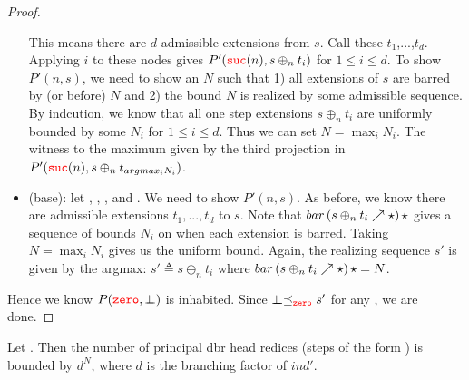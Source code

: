 \begin{proof}
\begin{itemize}
This means there are $d$ admissible extensions from $s$. Call these $t_1$,...,$t_d$.   
Applying $i$ to these nodes gives $P'({\color{red}{\mathtt{suc}}}(n), s\oplus_n t_i)$ for $1 \le i \le d$.
To show $P'(n,s)$, we need to show an $N$ such that 1) all extensions of $s$ are barred by (or before) $N$
and 2) the bound $N$ is realized by some admissible sequence. By indcution, we know that all 
one step extensions $s \oplus_n t_i$ are uniformly bounded by some $N_i$ for $1 \le i \le d$.
Thus we can set $N = \max_i{N_i}$. The witness to the maximum given by the third projection in 
$P'({\color{red}{\mathtt{suc}}}(n), s\oplus_n t_{argmax_i{N_i}})$. 
\item (base): let , , , and 
  . We need to show $P'(n,s)$. As before, we know there are admissible extensions
  $t_1,...,t_d$ to $s$. Note that $bar\,(s \oplus_n t_i \nearrow \star)\,\star$ gives a sequence of bounds $N_i$ 
  on when each extension is barred. Taking $N = \max_i{N_i}$ gives us the uniform bound. Again, the 
  realizing sequence $s'$ is given by the argmax: $s' \triangleq s \oplus_n t_i$ where
  $bar\,(s \oplus_n t_i \nearrow \star)\,\star = N$.
\end{itemize}
Hence we know $P(\zero,\empseq)$ is inhabited. Since $\empseq \preceq_{\zero} s'$ for any 
, we are done.
\end{proof}

\begin{lemma}
\iffalse 
  Suppose at each node, the number of successors is bounded by $d$, i.e. there is a value
  \begin{align*}
    \isVal{&fixed}{
      \sigmatyc{\isOf{d}{\lift{\nat}}}{\pityc{\isOf{n}{\lift{\nat}}}{\pityc{\isOf{s}{\lift{\nseq{n}}}}{
        \squash{R(n,s)} \tolr \\
        &\quad\quad\sigmatyc{\isOf{f}{\lift{\N_d} \to 
        \sigmatyc{\isOf{x}{\lift{\nat}}}{R(\suc{n},s \oplus_n x)}}}{\\
      &\quad\quad\quad\pityc{\isOf{y}{\lift{\nat}}}{
        R(\suc{n}, s\oplus_n y) \tolr \sigmatyc{\isOf{i}{\lift{\nat}}}{f(i) = y}
      }
    }
  }}}}
\end{align*}
\fi
Let . Then the number of principal dbr head 
redices (steps of the form ) is bounded by $d^N$, where
$d$ is the branching factor of $ind'$.
\end{lemma}

